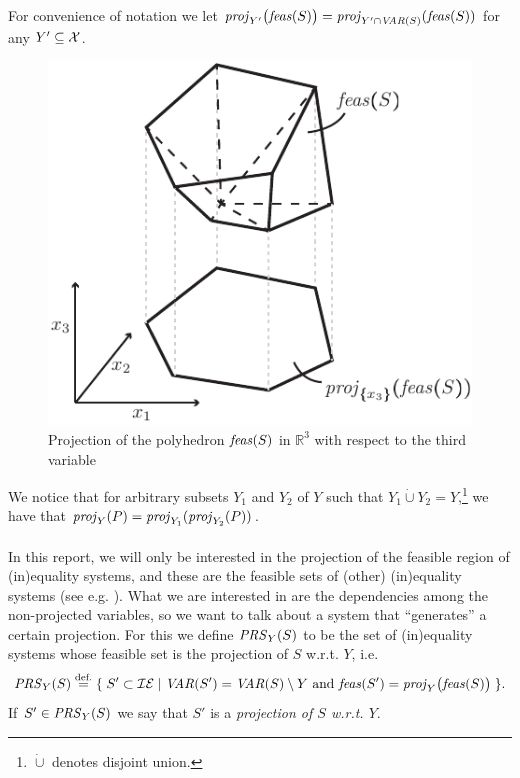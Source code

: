 For convenience of notation we let $\mathit{proj}_{Y'}\big(\mathit{feas}(S)\big) = \mathit{proj}_{Y'\cap \mathit{VAR}(S)}(\mathit{feas}(S))$ for any $Y'\subseteq \mathcal{X}$.

\begin{figure}
	\centering
		\includegraphics{figures/projection.pdf}
	\caption{Projection of the polyhedron $\mathit{feas}(S)$ in $\mathbb{R}^3$ with respect to the third variable }
	\label{fig:proj}
\end{figure}
We notice that for arbitrary subsets $Y_1$ and $Y_2$ of $Y$ such that $Y_1\dot\cup Y_2=Y$,\footnote{$\dot\cup$ denotes disjoint union.} we have that $\mathit{proj}_Y(P)=\mathit{proj}_{Y_1}(\mathit{proj}_{Y_2}(P))$. 
\\\\
In this report, we will only be interested in the projection of the feasible region of (in)equality systems,
and these are the feasible sets of (other) (in)equality systems (see e.g. \cite{ziegler95}). What we are interested in are the dependencies among the non-projected variables,  
so we want to talk about a system that ``generates'' a certain projection. For this we define $\mathit{PRS}_Y(S)$ to be the set of (in)equality systems whose feasible set is the projection of $S$ w.r.t. $Y$, i.e. 
\[
\mathit{PRS}_Y(S)\overset{\text{def.}}= \{\;{S'\subset\mathcal{IE}}\;|\;{\mathit{VAR}(S')=\mathit{VAR}(S)\setminus Y \text{ and }\mathit{feas}(S') = \mathit{proj}_Y\big(\mathit{feas}(S)\big)}\;\}.
\]
If $S'\in\mathit{PRS}_Y(S)$ we say that $S'$ is a \emph{projection of $S$ w.r.t. $Y$}.
 
